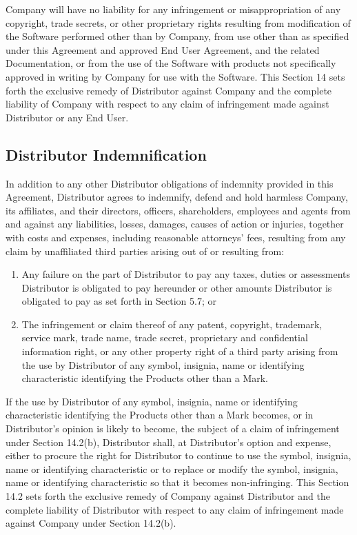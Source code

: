 \documentclass[letterpaper,10pt,english]{sphinxmanual}
\begin{document}
Company will have no liability for any infringement or misappropriation of any copyright, trade secrets, or other proprietary rights resulting from modification of the Software performed other than by Company, from use other than as specified under this Agreement and approved End User Agreement, and the related Documentation, or from the use of the Software with products not specifically approved in writing by Company for use with the Software. This Section 14 sets forth the exclusive remedy of Distributor against Company and the complete liability of Company with respect to any claim of infringement made against Distributor or any End User.


\subsection{Distributor Indemnification}
\label{\detokenize{indemnification:distributor-indemnification}}
In addition to any other Distributor obligations of indemnity provided in this Agreement, Distributor agrees to indemnify, defend and hold harmless Company, its affiliates, and their directors, officers, shareholders, employees and agents from and against any liabilities, losses, damages, causes of action or injuries, together with costs and expenses, including reasonable attorneys’ fees, resulting from any claim by unaffiliated third parties arising out of or resulting from:
\begin{enumerate}
\item {} 
Any failure on the part of Distributor to pay any taxes, duties or assessments Distributor is obligated to pay hereunder or other amounts Distributor is obligated to pay as set forth in Section 5.7; or

\item {} 
The infringement or claim thereof of any patent, copyright, trademark, service mark, trade name, trade secret, proprietary and confidential information right, or any other property right of a third party arising from the use by Distributor of any symbol, insignia, name or identifying characteristic identifying the Products other than a Mark.

\end{enumerate}

If  the use by Distributor of any symbol, insignia, name or identifying characteristic identifying the Products other than a Mark becomes, or in Distributor’s opinion is likely to become, the subject of a claim of infringement under Section 14.2(b), Distributor shall, at Distributor’s option and expense, either to procure the right for Distributor to continue to use the symbol, insignia, name or identifying characteristic or to replace or modify the symbol, insignia, name or identifying characteristic  so that it becomes non-infringing. This Section 14.2 sets forth the exclusive remedy of Company against Distributor and the complete liability of Distributor with respect to any claim of infringement made against Company under Section 14.2(b).
\end{document}
